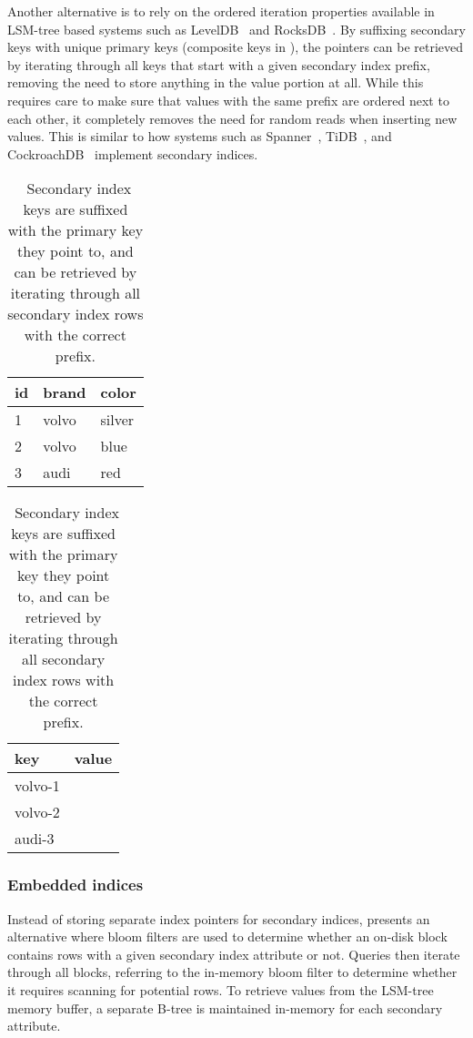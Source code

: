 Another alternative is to rely on the ordered iteration properties available in
LSM-tree based systems such as LevelDB~\cite{leveldb-iteration} and
RocksDB~\cite{rocksdb-iteration}. By suffixing secondary keys with unique
primary keys (composite keys in \cite{lsm-comparison}), the pointers can be
retrieved by iterating through all keys that start with a given secondary index
prefix, removing the need to store anything in the value portion at all. While
this requires care to make sure that values with the same prefix are ordered
next to each other, it completely removes the need for random reads when
inserting new values. This is similar to how systems such as
Spanner~\cite{spanner-sql}, TiDB~\cite{tidb-internal}, and
CockroachDB~\cite{cockroach-design} implement secondary indices.

\begin{table}[H]
  \centering
  \begin{tabular}{l l l}
    \toprule
    \textbf{id} & \textbf{brand} & \textbf{color} \\ \midrule
    1 & volvo & silver \\ \midrule
    2 & volvo & blue \\ \midrule
    3 & audi & red \\ \bottomrule
  \end{tabular}
  \quad
  \begin{tabular}{l l}
    \toprule
    \textbf{key} & \textbf{value} \\ \midrule
    volvo-1 & \\ \midrule
    volvo-2 & \\ \midrule
    audi-3 & \\ \bottomrule
  \end{tabular}

  \caption{\
    Secondary index keys are suffixed with the primary key they point to, and
    can be retrieved by iterating through all secondary index rows with the
    correct prefix.
  }\label{table:secondary-order}
\end{table}

\subsubsection{Embedded indices}

Instead of storing separate index pointers for secondary indices,
\cite{lsm-comparison} presents an alternative where bloom filters are used to
determine whether an on-disk block contains rows with a given secondary index
attribute or not. Queries then iterate through all blocks, referring to the
in-memory bloom filter to determine whether it requires scanning for potential
rows. To retrieve values from the LSM-tree memory buffer, a separate B-tree is
maintained in-memory for each secondary attribute.

